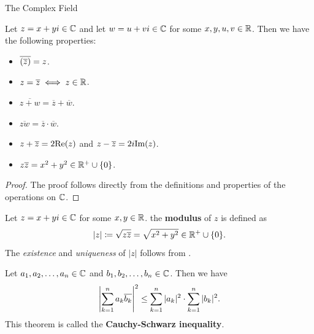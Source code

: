 \begin{section}{The Complex Field}
\bigskip

\begin{theorem} \label{thm:PropertiesOfComplexConjugate}
    Let $z = x + yi \in \C$ and let $w = u + vi \in \C$ for some $x, y, u, v \in \R$.
    Then we have the following properties:
    \begin{itemize}
        \item $\overline{\paren*{\overline{z}}} = z$.
        \item $z = \overline{z} \iff z \in \R$.
        \item $\overline{z + w} = \overline{z} + \overline{w}$.
        \item $\overline{zw} = \overline{z} \cdot \overline{w}$.
        \item $z + \overline{z} = 2\Real(z)$ and $z - \overline{z} = 2i\Imag(z)$.
        \item $z\overline{z} = x^{2} + y^{2} \in \R^{+} \cup \set*{0}$.
    \end{itemize}
\end{theorem}

\begin{proof}
    The proof follows directly from the definitions and properties of the operations on $\C$.
\end{proof}

\bigskip

\begin{definition} \label{def:Modulus}
    Let $z = x + yi \in \C$ for some $x, y \in \R$. the \textbf{modulus} of $z$ is defined as
    \[
    |z| \coloneqq \sqrt{z\overline{z}} = \sqrt{x^{2} + y^{2}} \in \R^{+} \cup \set*{0}.
    \]
    The \emph{existence} and \emph{uniqueness} of $|z|$ follows from
    .
\end{definition}

\bigskip

\begin{theorem} \label{thm:CauchySchwarzInequality}
    Let $a_{1}, a_{2}, \ldots, a_{n} \in \C$ and $b_{1}, b_{2}, \ldots, b_{n} \in \C$. Then we have
    \[
    \abs*{\sum_{k = 1}^{n} a_{k} \overline{b_{k}}}^{2}
    \leq \sum_{k = 1}^{n} |a_{k}|^{2} \cdot \sum_{k = 1}^{n} |b_{k}|^{2}.
    \]
    This theorem is called the \textbf{Cauchy-Schwarz inequality}.
\end{theorem}


\end{section}
